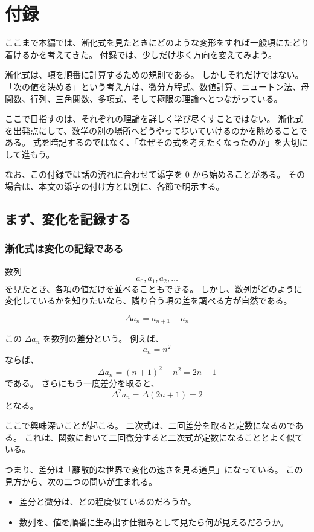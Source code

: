 
\chapter{付録}

ここまで本編では、漸化式を見たときにどのような変形をすれば一般項にたどり着けるかを考えてきた。
付録では、少しだけ歩く方向を変えてみよう。

漸化式は、項を順番に計算するための規則である。
しかしそれだけではない。
「次の値を決める」という考え方は、微分方程式、数値計算、ニュートン法、母関数、行列、三角関数、多項式、そして極限の理論へとつながっている。

ここで目指すのは、それぞれの理論を詳しく学び尽くすことではない。
漸化式を出発点にして、数学の別の場所へどうやって歩いていけるのかを眺めることである。
式を暗記するのではなく、「なぜその式を考えたくなったのか」を大切にして進もう。

なお、この付録では話の流れに合わせて添字を $0$ から始めることがある。
その場合は、本文の添字の付け方とは別に、各節で明示する。

\section{まず、変化を記録する}

\subsection{漸化式は変化の記録である}

数列
\[
  a_0,a_1,a_2,\ldots
\]
を見たとき、各項の値だけを並べることもできる。
しかし、数列がどのように変化しているかを知りたいなら、隣り合う項の差を調べる方が自然である。

\[
  \Delta a_n=a_{n+1}-a_n
\]

この $\Delta a_n$ を数列の\textbf{差分}という。
例えば、
\[
  a_n=n^2
\]
ならば、
\[
  \Delta a_n=(n+1)^2-n^2=2n+1
\]
である。
さらにもう一度差分を取ると、
\[
  \Delta^2a_n
  =\Delta(2n+1)=2
\]
となる。

ここで興味深いことが起こる。
二次式は、二回差分を取ると定数になるのである。
これは、関数において二回微分すると二次式が定数になることとよく似ている。

つまり、差分は「離散的な世界で変化の速さを見る道具」になっている。
この見方から、次の二つの問いが生まれる。

\begin{itemize}
  \item 差分と微分は、どの程度似ているのだろうか。
  \item 数列を、値を順番に生み出す仕組みとして見たら何が見えるだろうか。
\end{itemize}

